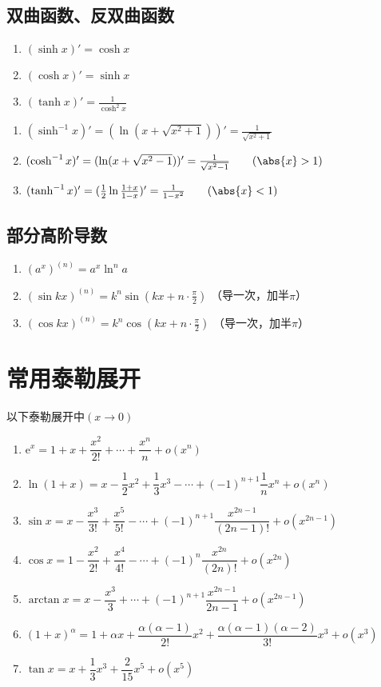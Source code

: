\subsection{双曲函数、反双曲函数}
\begin{enumerate}
    \item $(\sinh x)' = \cosh x$
    \item $(\cosh x)' = \sinh x$
    \item $(\tanh x)' = \frac{1}{\cosh^2 x}$
\end{enumerate}
\begin{enumerate}[\textcolor{red}{$\bigstar$}]
    \item $(\sinh^{-1} x)' = (\ln (x+\sqrt{x^2 + 1}))' = \frac{1}{\sqrt{x^2 + 1}}$
    \item $(\cosh^{-1} x)' = (\ln (x+\sqrt{x^2 - 1}))' = \frac{1}{\sqrt{x^2 - 1}} \qquad (\abs{x} > 1)$
    \item $(\tanh^{-1} x)' = (\frac{1}{2}\ln \frac{1+x}{1-x})' = \frac{1}{1-x^2} \qquad (\abs{x} < 1)$
\end{enumerate}

\subsection{部分高阶导数}
\begin{enumerate}
    \item $(a^x)^{(n)} = a^x\ln^n a$
    \item $(\sin kx)^{(n)} = k^n \sin(kx+n\cdot \frac{\pi}{2})$ （导一次，加半$\pi$）
    \item $(\cos kx)^{(n)} = k^n \cos(kx+n\cdot \frac{\pi}{2})$ （导一次，加半$\pi$）
\end{enumerate}

\section{常用泰勒展开}
以下泰勒展开中$(x\to 0)$
\begin{enumerate}
    \item $\mathrm{e}^x = 1 + x + \dfrac{x^2}{2!} + \cdots + \dfrac{x^n}{n} + o(x^n)$
    \item $\ln(1+x) = x - \dfrac{1}{2}x^2 + \dfrac{1}{3}x^3 -\cdots+(-1)^{n+1}\dfrac{1}{n}x^n + o(x^n)$
    \item $\sin x = x-\dfrac{x^3}{3!} + \dfrac{x^5}{5!} -\cdots +(-1)^{n+1}\dfrac{x^{2n-1}}{(2n-1)!}+o(x^{2n-1})$
    \item $\cos x = 1 - \dfrac{x^2}{2!} + \dfrac{x^4}{4!} - \cdots + (-1)^n\dfrac{x^{2n}}{(2n)!} + o(x^{2n})$
    \item $\arctan x = x - \dfrac{x^3}{3} + \cdots +(-1)^{n+1}\dfrac{x^{2n-1}}{2n-1}+o(x^{2n-1})$
    \item $(1+x)^\alpha = 1 + \alpha x +\dfrac{\alpha(\alpha-1)}{2!}x^2 + \dfrac{\alpha(\alpha-1)(\alpha-2)}{3!}x^3 + o(x^3)$
    \item $\tan x = x + \dfrac{1}{3}x^3 + \dfrac{2}{15}x^5 + o(x^5)$
\end{enumerate}

